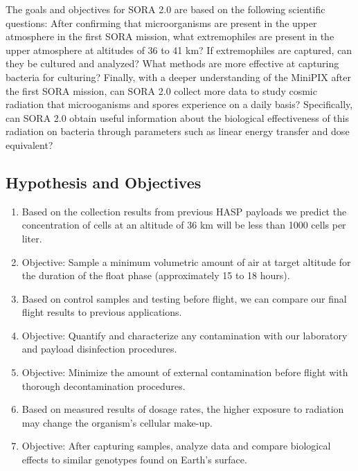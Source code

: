 The goals and objectives for SORA 2.0 are based on the following scientific questions: After confirming that microorganisms are present in the upper atmosphere in the first SORA mission, what extremophiles are present in the upper atmosphere at altitudes of 36 to 41 km?  If extremophiles are captured, can they be cultured and analyzed?  What methods are more effective at capturing bacteria for culturing? Finally, with a deeper understanding of the MiniPIX after the first SORA mission, can SORA 2.0 collect more data to study cosmic radiation that microoganisms and spores experience on a daily basis? Specifically, can SORA 2.0 obtain useful information about the biological effectiveness of this radiation on bacteria through parameters such as linear energy transfer and dose equivalent? 

\subsection{Hypothesis and Objectives}
\label{subsec:Hypothesis and Objectives}
\begin{enumerate}
	\item Based on the collection results from previous HASP payloads we predict the concentration of cells at an altitude of 36 km will be less than 1000 cells per liter.
	\item Objective: Sample a minimum volumetric amount of air at target altitude for the duration of the float phase (approximately 15 to 18 hours).
	\item Based on control samples and testing before flight, we can compare our final flight results to previous applications.
	\item Objective: Quantify and characterize any contamination with our laboratory and payload disinfection procedures.
	\item Objective: Minimize the amount of external contamination before flight with thorough decontamination procedures.
	\item Based on measured results of dosage rates, the higher exposure to radiation may change the organism's cellular make-up.
	\item Objective: After capturing samples, analyze data and compare biological effects to similar genotypes found on Earth's surface.

\end{enumerate}
